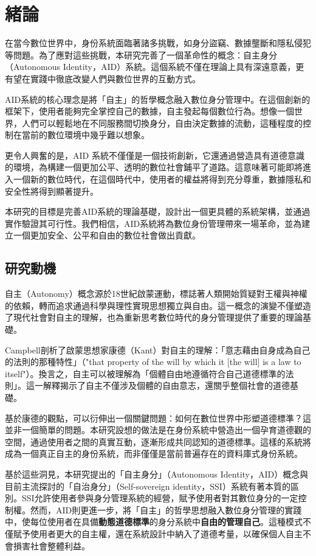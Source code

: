 
\chapter{緒論}
在當今數位世界中，身份系統面臨著諸多挑戰，如身分盜竊、數據壟斷和隱私侵犯等問題。為了應對這些挑戰，本研究完善了一個革命性的概念：自主身分（Autonomous Identity，AID）系統。這個系統不僅在理論上具有深遠意義，更有望在實踐中徹底改變人們與數位世界的互動方式。

AID系統的核心理念是將「自主」的哲學概念融入數位身分管理中。在這個創新的框架下，使用者能夠完全掌控自己的數據，自主發起每個數位行為。想像一個世界，人們可以輕鬆地在不同服務間切換身分，自由決定數據的流動，這種程度的控制在當前的數位環境中幾乎難以想象。

更令人興奮的是，AID 系統不僅僅是一個技術創新，它還通過營造具有道德意識的環境，為構建一個更加公平、透明的數位社會鋪平了道路。這意味著可能即將進入一個新的數位時代，在這個時代中，使用者的權益將得到充分尊重，數據隱私和安全性將得到顯著提升。

本研究的目標是完善AID系統的理論基礎，設計出一個更具體的系統架構，並通過實作驗證其可行性。我們相信，AID系統將為數位身份管理帶來一場革命，並為建立一個更加安全、公平和自由的數位社會做出貢獻。
\section{研究動機}
自主（Autonomy）概念源於18世紀啟蒙運動，標誌著人類開始質疑對王權與神權的依賴，轉而追求通過科學與理性實現思想獨立與自由。這一概念的演變不僅塑造了現代社會對自主的理解，也為重新思考數位時代的身分管理提供了重要的理論基礎。

Campbell\cite{CAMPBELL2017381}剖析了啟蒙思想家康德（Kant）對自主的理解：「意志藉由自身成為自己的法則的那種特性」（"that property of the will by which it [the will] is a law to itself"）。換言之，自主可以被理解為「個體自由地遵循符合自己道德標準的法則」。這一解釋揭示了自主不僅涉及個體的自由意志，還關乎整個社會的道德基礎。

基於康德的觀點，可以衍伸出一個關鍵問題：如何在數位世界中形塑道德標準？這並非一個簡單的問題。本研究設想的做法是在身份系統中營造出一個孕育道德觀的空間，通過使用者之間的真實互動，逐漸形成共同認知的道德標準。這樣的系統將成為一個真正自主的身份系統，而非僅僅是當前普遍存在的資料庫式身份系統。

基於這些洞見，本研究提出的「自主身分」（Autonomous Identity，AID）概念與目前主流探討的「自治身分」（Self-sovereign identity，SSI）系統有著本質的區別。SSI允許使用者參與身分管理系統的經營，賦予使用者對其數位身分的一定控制權。然而，AID則更進一步，將「自主」的哲學思想融入數位身分管理的實踐中，使每位使用者在具備\textbf{動態道德標準}的身分系統中\textbf{自由的管理自己}。這種模式不僅賦予使用者更大的自主權，還在系統設計中納入了道德考量，以確保個人自主不會損害社會整體利益。
